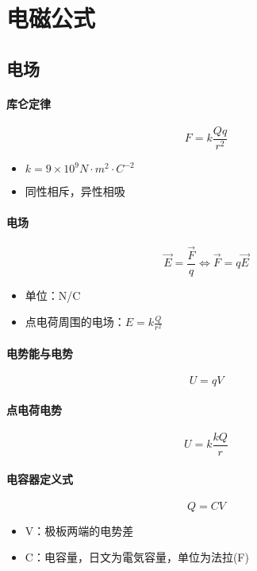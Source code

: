 \section{电磁公式}

\subsection{电场}

\paragraph{库仑定律}
\begin{equation*}
    F=k\frac{Qq}{r^2}
\end{equation*}
\begin{itemize}
    \item $k=9\times10^9N\cdot m^2\cdot C^{-2}$
    \item 同性相斥，异性相吸
\end{itemize}

\paragraph{电场}
\begin{equation*}
    \vec{E}=\frac{\vec{F}}{q}
    \iff
    \vec{F}=q\vec{E}
\end{equation*}
\begin{itemize}
    \item 单位：N/C
    \item 点电荷周围的电场：$E=k\frac{Q}{r^2}$
\end{itemize}

\paragraph{电势能与电势}
\begin{equation*}
    U=qV
\end{equation*}

\paragraph{点电荷电势}
\begin{equation*}
    U=k\frac{kQ}{r}
\end{equation*}

\paragraph{电容器定义式}
\begin{equation*}
    Q=CV
\end{equation*}
\begin{itemize}
    \item V：极板两端的电势差
    \item C：电容量，日文为電気容量，单位为法拉(F)
\end{itemize}

